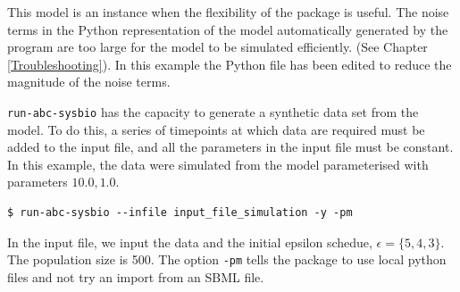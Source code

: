 \documentclass[a4paper]{report}
\begin{document}
This model is an instance when the flexibility of the package is useful. The noise terms in the Python representation of the model automatically generated by the program are too large for the model to be simulated efficiently. (See Chapter \ref{Troubleshooting}). In this example the Python file has been edited to reduce the magnitude of the noise terms. 

\verb$run-abc-sysbio$ has the capacity to generate a synthetic data set from the model. To do this, a series of timepoints at which data are required must be added to the input file, and all the parameters in the input file must be constant. In this example, the data were simulated from the model parameterised with parameters $10.0, 1.0$.
\begin{verbatim}
$ run-abc-sysbio --infile input_file_simulation -y -pm
\end{verbatim}
In the input file, we input the data and the initial epsilon schedue, $\epsilon = \{5, 4, 3\}$. The population size is 500. The option \verb$-pm$ tells the package to use local python files and not try an import from an SBML file.
\end{document}
